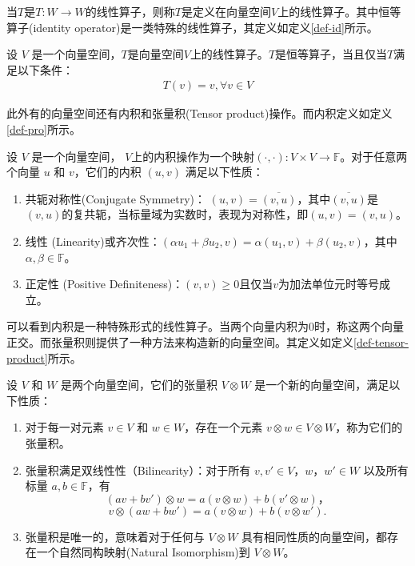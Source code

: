 当$T$是\(T: W \rightarrow W\)的线性算子，则称$T$是定义在向量空间$V$上的线性算子。其中恒等算子(identity operator)是一类特殊的线性算子，其定义如定义\ref{def-id}所示。
\begin{definition}\citep{greub2012linear}
    \label{def-id}
    设 \(V\) 是一个向量空间，$T$是向量空间$V$上的线性算子。$T$是恒等算子，当且仅当$T$满足以下条件：
    \begin{align}
        T(v) = v,\forall v \in V
    \end{align}
\end{definition}

此外有的向量空间还有内积和张量积(Tensor product)操作。而内积定义如定义\ref{def-pro}所示。
\begin{definition}\citep{greub2012linear}
    \label{def-pro}
    设 \(V\) 是一个向量空间，
    \(V\)上的内积操作为一个映射\(( \cdot, \cdot ): V \times V \rightarrow \mathbb{F}\)。对于任意两个向量 $u$ 和 $v$，它们的内积 $( u, v )$ 满足以下性质：
\begin{enumerate}
    \item 共轭对称性(Conjugate Symmetry)： \(( u, v ) = \overline{( v, u )}\)，其中\(\overline{( v, u )}\)是\(( v, u )\)的复共轭，当标量域为实数时，表现为对称性，即\(( u, v ) = ( v, u )\)。
    \item 线性 (Linearity)或齐次性：\(( \alpha u_1 + \beta u_2, v ) = \alpha( u_1, v ) + \beta( u_2, v )\)，其中\(\alpha,\beta\in\mathbb{F}\)。
    \item 正定性 (Positive Definiteness)：\(( v, v ) \geq 0\)且仅当\(v \)为加法单位元时等号成立。
\end{enumerate}
\end{definition}
可以看到内积是一种特殊形式的线性算子。当两个向量内积为$0$时，称这两个向量正交。而张量积则提供了一种方法来构造新的向量空间。其定义如定义\ref{def-tensor-product}所示。
\begin{definition}\citep{greub2012linear}
    \label{def-tensor-product}
    设 \(V\) 和 \(W\) 是两个向量空间，它们的张量积 \(V \otimes W\) 是一个新的向量空间，满足以下性质：
\begin{enumerate}
    \item 对于每一对元素 \(v \in V\) 和 \(w \in W\)，存在一个元素 \(v \otimes w \in V \otimes W\)，称为它们的张量积。
    \item 张量积满足双线性性（Bilinearity）：对于所有 \(v,v' \in V\)，\(w，w' \in W\) 以及所有标量 \(a,b \in \mathbb{F}\)，有
    \[
    (av + bv') \otimes w = a(v \otimes w) + b(v' \otimes w)，
    \]
    \[
    v \otimes (aw + bw') = a(v \otimes w) + b(v \otimes w').
    \]
    \item 张量积是唯一的，意味着对于任何与 \(V \otimes W\) 具有相同性质的向量空间，都存在一个自然同构映射(Natural Isomorphism)到 \(V \otimes W\)。
\end{enumerate}
\end{definition}


